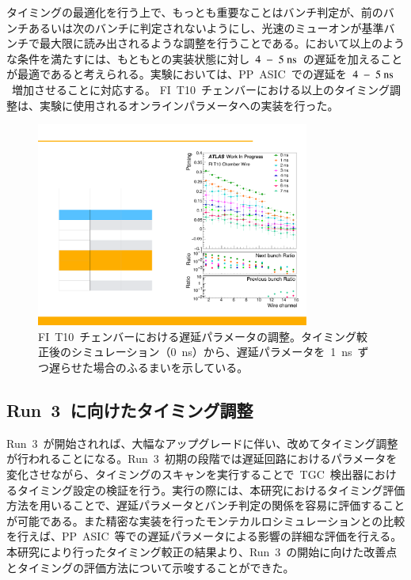 タイミングの最適化を行う上で、もっとも重要なことはバンチ判定が、前のバンチあるいは次のバンチに判定されないようにし、光速のミューオンが基準バンチで最大限に読み出されるような調整を行うことである。において以上のような条件を満たすには、もともとの実装状態に対し~$4~-~5~\rm{ns}$~の遅延を加えることが最適であると考えられる。実験においては、PP~ASIC~での遅延を~$4~-~5~\rm{ns}$~増加させることに対応する。
FI~T10~チェンバーにおける以上のタイミング調整は、実験に使用されるオンラインパラメータへの実装を行った。
\begin{figure}[H]
    \centering   
    \includegraphics[width=0.8\textwidth,page=1]{img/plot/FItune.pdf}
    \caption[FI T10 チェンバーにおける遅延パラメータの調整]{FI~T10~チェンバーにおける遅延パラメータの調整。タイミング較正後のシミュレーション（0~ns）から、遅延パラメータを~1~ns~ずつ遅らせた場合のふるまいを示している。}
    \label{fig:fitune}
\end{figure}

\subsection{Run~3~に向けたタイミング調整}
Run~3~が開始されれば、大幅なアップグレードに伴い、改めてタイミング調整が行われることになる。Run~3~初期の段階では遅延回路におけるパラメータを変化させながら、タイミングのスキャンを実行することで~TGC~検出器におけるタイミング設定の検証を行う。実行の際には、本研究におけるタイミング評価方法を用いることで、遅延パラメータとバンチ判定の関係を容易に評価することが可能である。また精密な実装を行ったモンテカルロシミュレーションとの比較を行えば、PP~ASIC~等での遅延パラメータによる影響の詳細な評価を行える。
本研究により行ったタイミング較正の結果より、Run~3~の開始に向けた改善点とタイミングの評価方法について示唆することができた。
